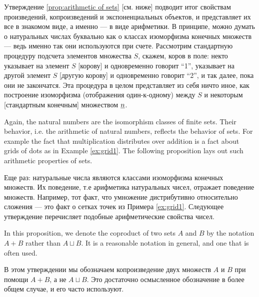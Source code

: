 \documentclass[CT4S-EN-RU]{subfiles}
\begin{document}
\begin{blockRUS}
Утверждение \ref{prop:arithmetic of sets} [см. ниже] подводит итог свойствам произведений, копроизведений и экспоненциальных объектов, и представляет их все в знакомом виде, а именно — в виде арифметики. В принципе, можно думать о натуральных числах буквально как о классах изоморфизма конечных множеств — ведь именно так они используются при счете. Рассмотрим стандартную процедуру подсчета элементов множества $S$, скажем, коров в поле: некто указывает на элемент $S$ [корову] и одновременно говорит “1”, указывает на другой элемент $S$ [другую корову] и одновременно говорит “2”, и так далее, пока они не закончатся. Эта процедура в целом представляет из себя ничто иное, как построение изоморфизма (отображения один-к-одному) между $S$ и некоторым [стандартным конечным] множеством $\underline{n}$. 
\end{blockRUS}

\begin{blockENG}
Again, the natural numbers are the isomorphism classes of finite sets. Their behavior, i.e. the arithmetic of natural numbers, reflects the behavior of sets. For example the fact that multiplication distributes over addition is a fact about grids of dots as in Example \ref{ex:grid1}. The following proposition lays out such arithmetic properties of sets.
\end{blockENG}

\begin{blockRUS}
Еще раз: натуральные числа являются классами изоморфизма конечных множеств. Их поведение, т.е арифметика натуральных чисел, отражает поведение множеств. Например, тот факт, что умножение дистрибутивно относительно сложения — это факт о сетках точек из Примера \ref{ex:grid1}. Следующее утверждение перечисляет подобные арифметические свойства чисел.
\end{blockRUS}

\begin{blockENG}
In this proposition, we denote the coproduct of two sets $A$ and $B$ by the notation $A+B$ rather than $A\sqcup B$. It is a reasonable notation in general, and one that is often used. 
\end{blockENG}

\begin{blockRUS}
В этом утверждении мы обозначаем копроизведение двух множеств $A$ и $B$ при помощи $A+B$, а не $A\sqcup B$. Это достаточно осмысленное обозначение в более общем случае, и его часто используют. 
\end{blockRUS}
\end{document}
